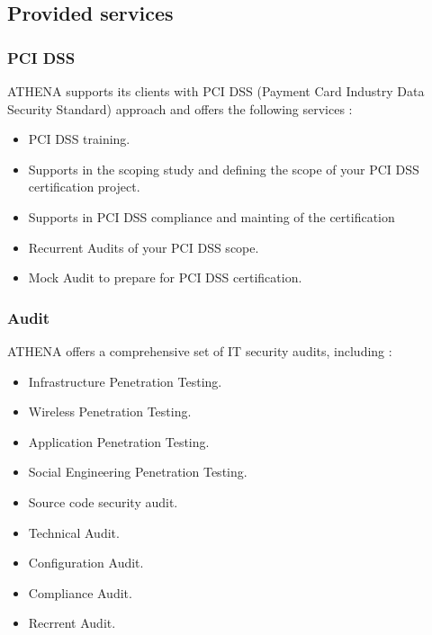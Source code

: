 






\subsection{Provided services }

\subsubsection{PCI DSS}
ATHENA supports its clients with PCI DSS (Payment Card Industry Data Security Standard) approach and offers the following services :
\begin{itemize}
\item PCI DSS training. 
\item Supports in the scoping study and defining the scope of your PCI DSS certification project.
\item Supports in PCI DSS compliance and mainting of the certification
\item Recurrent Audits of your PCI DSS scope.
\item Mock Audit to prepare for PCI DSS certification.
\end{itemize}
\subsubsection{Audit}
ATHENA offers a comprehensive set of IT security audits, including :
\begin{itemize}
\item Infrastructure Penetration Testing.
\item Wireless Penetration Testing.
\item Application Penetration Testing.
\item Social Engineering Penetration Testing.
\item Source code security audit.
\item Technical Audit.
\item Configuration Audit.
\item Compliance Audit.
\item Recrrent Audit.
\end{itemize}
